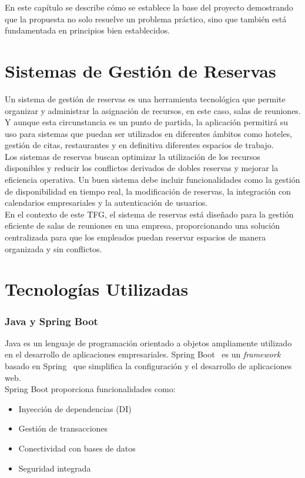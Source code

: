 
En este capítulo se describe cómo se establece la base del proyecto demostrando que la propuesta no solo resuelve un problema práctico, sino que también está fundamentada en principios bien establecidos.\\

\section{Sistemas de Gestión de Reservas}

Un sistema de gestión de reservas es una herramienta tecnológica que permite organizar y administrar la asignación de recursos, en este caso, salas de reuniones. Y aunque esta circunstancia es un punto de partida, la aplicación permitirá su uso para sistemas que puedan ser utilizados en diferentes ámbitos como hoteles, gestión de citas, restaurantes y en definitiva diferentes espacios de trabajo.\\

Los sistemas de reservas buscan optimizar la utilización de los recursos disponibles y reducir los conflictos derivados de dobles reservas y mejorar la eficiencia operativa. Un buen sistema debe incluir funcionalidades como la gestión de disponibilidad en tiempo real, la modificación de reservas, la integración con calendarios empresariales y la autenticación de usuarios.\\

En el contexto de este TFG, el sistema de reservas está diseñado para la gestión eficiente de salas de reuniones en una empresa, proporcionando una solución centralizada para que los empleados puedan reservar espacios de manera organizada y sin conflictos.

\section{Tecnologías Utilizadas}
\subsubsection{Java y Spring Boot}
Java es un lenguaje de programación orientado a objetos ampliamente utilizado en el desarrollo de aplicaciones empresariales. Spring Boot~\cite{spring-boot} es un \emph{framework}~\cite{framework} basado en Spring~\cite{spring} que simplifica la configuración y el desarrollo de aplicaciones web.\\
Spring Boot proporciona funcionalidades como:
\begin{itemize}
\tightlist
\item
Inyección de dependencias (DI)
\item
Gestión de transacciones
\item
Conectividad con bases de datos
\item
Seguridad integrada
\end{itemize}

